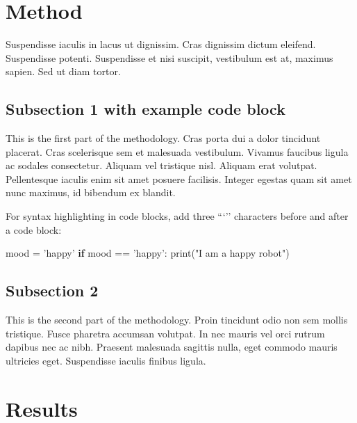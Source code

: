 \documentclass[12pt,turkish,a4paperpaper,]{report}
\newenvironment{Shaded}{}{}
\newcommand{\BuiltInTok}[1]{#1}
\newcommand{\ControlFlowTok}[1]{\textcolor[rgb]{0.00,0.44,0.13}{\textbf{#1}}}
\newcommand{\NormalTok}[1]{#1}
\newcommand{\OperatorTok}[1]{\textcolor[rgb]{0.40,0.40,0.40}{#1}}
\newcommand{\StringTok}[1]{\textcolor[rgb]{0.25,0.44,0.63}{#1}}
\begin{document}
\hypertarget{method}{%
\section{Method}\label{method}}

Suspendisse iaculis in lacus ut dignissim. Cras dignissim dictum
eleifend. Suspendisse potenti. Suspendisse et nisi suscipit, vestibulum
est at, maximus sapien. Sed ut diam tortor.

\hypertarget{subsection-1-with-example-code-block}{%
\subsection{Subsection 1 with example code
block}\label{subsection-1-with-example-code-block}}

This is the first part of the methodology. Cras porta dui a dolor
tincidunt placerat. Cras scelerisque sem et malesuada vestibulum.
Vivamus faucibus ligula ac sodales consectetur. Aliquam vel tristique
nisl. Aliquam erat volutpat. Pellentesque iaculis enim sit amet posuere
facilisis. Integer egestas quam sit amet nunc maximus, id bibendum ex
blandit.

For syntax highlighting in code blocks, add three ```'' characters
before and after a code block:

\begin{Shaded}
\begin{Highlighting}[]
\NormalTok{mood }\OperatorTok{=} \StringTok{'happy'}
\ControlFlowTok{if}\NormalTok{ mood }\OperatorTok{==} \StringTok{'happy'}\NormalTok{:}
    \BuiltInTok{print}\NormalTok{(}\StringTok{"I am a happy robot"}\NormalTok{)}
\end{Highlighting}
\end{Shaded}

\hypertarget{subsection-2}{%
\subsection{Subsection 2}\label{subsection-2}}

This is the second part of the methodology. Proin tincidunt odio non sem
mollis tristique. Fusce pharetra accumsan volutpat. In nec mauris vel
orci rutrum dapibus nec ac nibh. Praesent malesuada sagittis nulla, eget
commodo mauris ultricies eget. Suspendisse iaculis finibus ligula.

\hypertarget{results}{%
\section{Results}\label{results}}
\end{document}
